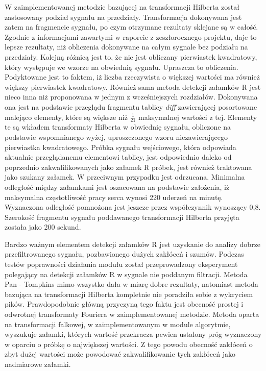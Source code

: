 W zaimplementowanej metodzie bazującej na transformacji Hilberta został zastosowany podział sygnału na przedziały. Transformacja dokonywana jest zatem na fragmencie sygnału, po czym otrzymane rezultaty sklejane są w całość. Zgodnie z informacjami zawartymi w raporcie z zeszłorocznego projektu, daje to lepsze rezultaty, niż obliczenia dokonywane na całym sygnale bez podziału na przedziały. Kolejną różnicą jest to, że nie jest obliczany pierwiastek kwadratowy, który występuje we wzorze na obwiednią sygnału. Upraszcza to obliczenia. Podyktowane jest to faktem, iż liczba rzeczywista o większej wartości ma również większy pierwiastek kwadratowy. Również sama metoda detekcji załamków R jest nieco inna niż proponowana w jednym z wcześniejszych rozdziałów. Dokonywana ona jest na podstawie przeglądu fragmentu tablicy \textit{diff} zawierającej posortowane malejąco elementy, które są większe niż $\frac{1}{21}$ maksymalnej wartości z tej. Elementy te są wkładem transformaty Hilberta w obwiednię sygnału, obliczone na podstawie wspomnianego wyżej, uproszczonego wzoru niezawierającego pierwiastka kwadratowego. Próbka sygnału wejściowego, która odpowiada aktualnie przeglądanemu elementowi tablicy, jest odpowiednio daleko od poprzednio zakwalifikowanych jako załamek R próbek, jest również traktowana jako szukany załamek. W przeciwnym przypadku jest odrzucana. Minimalna odległość między załamkami jest oszacowana na podstawie założenia, iż maksymalna częstotliwość pracy serca wynosi 220 uderzeń na minutę. Wyznaczona odległość pomnożona jest jeszcze przez współczynnik wynoszący 0,8. Szerokość fragmentu sygnału poddawanego transformacji Hilberta przyjęta została jako 200 sekund.

Bardzo ważnym elementem detekcji załamków R jest uzyskanie do analizy dobrze przefiltrowanego sygnału, pozbawionego dużych zakłóceń i szumów. Podczas testów poprawności działania modułu został przeprowadzony eksperyment polegający na detekcji załamków R w sygnale nie poddanym filtracji. Metoda Pan - Tompkins mimo wszystko dała w miarę dobre rezultaty, natomiast metoda bazująca na transformacji Hilberta kompletnie nie poradziła sobie z wykryciem pików. Prawdopodobnie główną przyczyną tego faktu jest obecność prostej i odwrotnej transformaty Fouriera w zaimplementowanej metodzie. Metoda oparta na transformacji falkowej, w zaimplementowanym w module algorytmie, wyszukuje załamki, których wartość przekracza pewien ustalony próg wyznaczony w oparciu o próbkę o największej wartości. Z tego powodu obecność zakłóceń o zbyt dużej wartości może powodować zakwalifikowanie tych zakłóceń jako nadmiarowe załamki.

